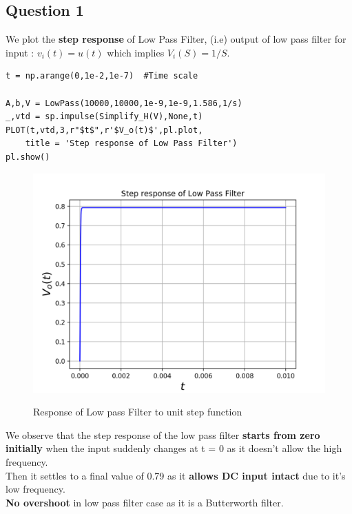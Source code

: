 \documentclass[11pt, a4paper]{article}
\begin{document}
\subsection{Question 1}
{
We plot the \textbf{step response} of Low Pass Filter, (i.e) output of low pass filter for input :
\(v_i(t) = u(t)\)
which implies $V_i(S) = 1/S$.
}
\begin{verbatim}
t = np.arange(0,1e-2,1e-7)  #Time scale

A,b,V = LowPass(10000,10000,1e-9,1e-9,1.586,1/s)
_,vtd = sp.impulse(Simplify_H(V),None,t)
PLOT(t,vtd,3,r"$t$",r'$V_o(t)$',pl.plot,
	title = 'Step response of Low Pass Filter')
pl.show()

\end{verbatim}
\begin{figure}[H]
   	\centering
   	\includegraphics[scale=0.5]{step_lpf.png}
   	\label{fig:step_lpf}
   	\caption{Response of Low pass Filter to unit step function}
\end{figure}
{ 
We observe that the step response of the low pass filter \textbf{starts from zero initially} when the input suddenly changes at t = 0 as it doesn't allow the high frequency.
\\Then it settles to a final value of 0.79 as it \textbf{allows DC input intact} due to it's low frequency.
\\\textbf{No overshoot} in low pass filter case as it is a Butterworth filter.
}
\end{document}
